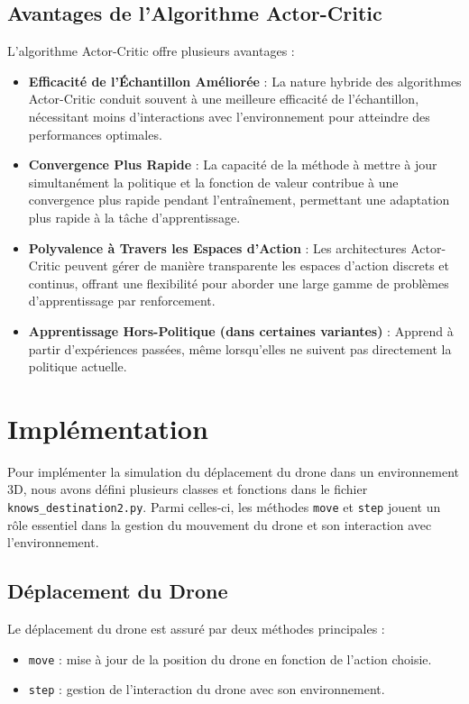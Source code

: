 \documentclass[a4paper, 12pt]{article}
\begin{document}
\subsection{Avantages de l'Algorithme Actor-Critic}
L'algorithme Actor-Critic offre plusieurs avantages :
\begin{itemize}
    \item \textbf{Efficacité de l'Échantillon Améliorée} : La nature hybride des algorithmes Actor-Critic conduit souvent à une meilleure efficacité de l'échantillon, nécessitant moins d'interactions avec l'environnement pour atteindre des performances optimales.
    \item \textbf{Convergence Plus Rapide} : La capacité de la méthode à mettre à jour simultanément la politique et la fonction de valeur contribue à une convergence plus rapide pendant l'entraînement, permettant une adaptation plus rapide à la tâche d'apprentissage.
    \item \textbf{Polyvalence à Travers les Espaces d'Action} : Les architectures Actor-Critic peuvent gérer de manière transparente les espaces d'action discrets et continus, offrant une flexibilité pour aborder une large gamme de problèmes d'apprentissage par renforcement.
    \item \textbf{Apprentissage Hors-Politique (dans certaines variantes)} : Apprend à partir d'expériences passées, même lorsqu'elles ne suivent pas directement la politique actuelle.
\end{itemize}

\section{Implémentation}

Pour implémenter la simulation du déplacement du drone dans un environnement 3D, nous avons défini plusieurs classes et fonctions dans le fichier \texttt{knows\_destination2.py}. Parmi celles-ci, les méthodes \texttt{move} et \texttt{step} jouent un rôle essentiel dans la gestion du mouvement du drone et son interaction avec l’environnement.

\subsection{Déplacement du Drone}

Le déplacement du drone est assuré par deux méthodes principales :
\begin{itemize}
    \item \texttt{move} : mise à jour de la position du drone en fonction de l’action choisie.
    \item \texttt{step} : gestion de l’interaction du drone avec son environnement.
\end{itemize}
\end{document}
